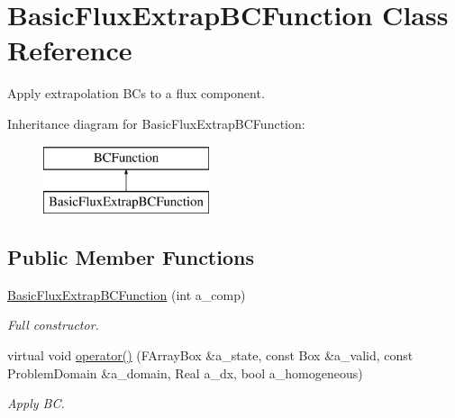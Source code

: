 \hypertarget{class_basic_flux_extrap_b_c_function}{\section{Basic\-Flux\-Extrap\-B\-C\-Function Class Reference}
\label{class_basic_flux_extrap_b_c_function}
}


Apply extrapolation B\-Cs to a flux component.  


Inheritance diagram for Basic\-Flux\-Extrap\-B\-C\-Function\-:\begin{figure}[H]
\begin{center}
\leavevmode
\includegraphics[height=2.000000cm]{class_basic_flux_extrap_b_c_function}
\end{center}
\end{figure}
\subsection*{Public Member Functions}
\begin{DoxyCompactItemize}
\item 
\hypertarget{class_basic_flux_extrap_b_c_function_a0f3d312b4ee41771e6e48b8bd4f17469}{\hyperlink{class_basic_flux_extrap_b_c_function_a0f3d312b4ee41771e6e48b8bd4f17469}{Basic\-Flux\-Extrap\-B\-C\-Function} (int a\-\_\-comp)}\label{class_basic_flux_extrap_b_c_function_a0f3d312b4ee41771e6e48b8bd4f17469}

\begin{DoxyCompactList}\small\item\em Full constructor. \end{DoxyCompactList}\item 
\hypertarget{class_basic_flux_extrap_b_c_function_abe5db40b5f849d39e06b44376d0b6bdf}{virtual void \hyperlink{class_basic_flux_extrap_b_c_function_abe5db40b5f849d39e06b44376d0b6bdf}{operator()} (F\-Array\-Box \&a\-\_\-state, const Box \&a\-\_\-valid, const Problem\-Domain \&a\-\_\-domain, Real a\-\_\-dx, bool a\-\_\-homogeneous)}\label{class_basic_flux_extrap_b_c_function_abe5db40b5f849d39e06b44376d0b6bdf}

\begin{DoxyCompactList}\small\item\em Apply B\-C. \end{DoxyCompactList}\end{DoxyCompactItemize}
